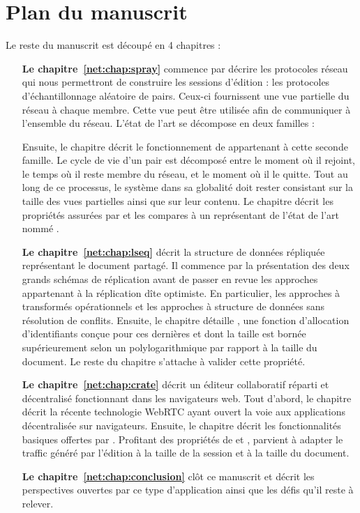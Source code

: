 
\section{Plan du manuscrit}

Le reste du manuscrit est découpé en 4 chapitres :

\begin{itemize}
\item [\textbf{Le chapitre~\ref{net:chap:spray}}] commence par décrire les
  protocoles réseau qui nous permettront de construire les sessions d'édition :
  les protocoles d'échantillonnage aléatoire de pairs. Ceux-ci fournissent une
  vue partielle du réseau à chaque membre. Cette vue peut être utilisée afin de
  communiquer à l'ensemble du réseau. L'état de l'art se décompose en deux
  familles :
  Ensuite, le chapitre décrit le fonctionnement de \SPRAY appartenant à cette
  seconde famille. Le cycle de vie d'un pair est décomposé entre le moment où il
  rejoint, le temps où il reste membre du réseau, et le moment où il le
  quitte. Tout au long de ce processus, le système dans sa globalité doit rester
  consistant sur la taille des vues partielles ainsi que sur leur contenu.  Le
  chapitre décrit les propriétés assurées par \SPRAY et les compares à un
  représentant de l'état de l'art nommé \CYCLON.
\item [\textbf{Le chapitre~\ref{net:chap:lseq}}] décrit la structure de données
  répliquée représentant le document partagé. Il commence par la présentation
  des deux grands schémas de réplication avant de passer en revue les approches
  appartenant à la réplication dîte optimiste. En particulier, les approches à
  transformés opérationnels et les approches à structure de données sans
  résolution de conflits. Ensuite, le chapitre détaille \LSEQ, une fonction
  d'allocation d'identifiants conçue pour ces dernières et dont la taille est
  bornée supérieurement selon un polylogarithmique par rapport à la taille du
  document. Le reste du chapitre s'attache à valider cette propriété.
\item [\textbf{Le chapitre~\ref{net:chap:crate}}] décrit un éditeur collaboratif
  réparti et décentralisé fonctionnant dans les navigateurs web.  Tout d'abord,
  le chapitre décrit la récente technologie WebRTC ayant ouvert la voie aux
  applications décentralisée sur navigateurs. Ensuite, le chapitre décrit les
  fonctionnalités basiques offertes par \CRATE.  Profitant des propriétés de
  \SPRAY et \LSEQ, \CRATE parvient à adapter le traffic généré par l'édition à
  la taille de la session et à la taille du document. 
\item [\textbf{Le chapitre~\ref{net:chap:conclusion}}] clôt ce manuscrit et
  décrit les perspectives ouvertes par ce type d'application ainsi que les défis
  qu'il reste à relever.
\end{itemize}

